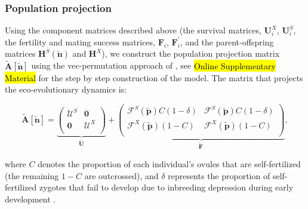 \documentclass[11pt]{article}
\def\mbf#1{\mathbf{#1}}
\def\mcal#1{\mathcal{#1}}
\begin{document}
\subsubsection*{Population projection}
Using the component matrices described above (the survival matrices, $\mathbf{U}^X_i$, $\mathbf{U}^S_i$, the fertility and mating success matrices, $\mathbf{F}_i$, $\mathbf{F}^\prime_i$, and the parent-offspring matrices $\mbf{H}^S(\tilde{\mbf{n}})$ and $\mbf{H}^X$), we construct the population projection matrix $\tilde{\mbf{A}}[\tilde{\mbf{n}}]$ using the vec-permutation approach of \citet{CaswellEtAl2018}, see \hl{Online Supplementary Material} for the step by step construction of the model. The matrix that projects the eco-evolutionary dynamics is:
\begin{linenomath*}
\begin{equation} \label{eq:Atilde}
	\tilde{\mbf{A}}[\tilde{\mbf{n}}] = 
			\underbrace{\left(
			\begin{array}{c|c}
				\mcal{U}^S & \mbf{0} \\ \hline
				\mbf{0} & \mcal{U}^X \\
			\end{array} \right)}_{\tilde{\mbf{U}}} + 
			\underbrace{\left(
			\begin{array}{c|c}
				\mcal{F}^S(\tilde{\mbf{p}}) C(1 - \delta) & \mcal{F}^S(\tilde{\mbf{p}}) C(1 - \delta) \\ \hline
				\mcal{F}^X(\tilde{\mbf{p}}) (1 - C) & \mcal{F}^X(\tilde{\mbf{p}}) (1 - C)\\
			\end{array} \right)}_{\tilde{\mbf{F}}},
\end{equation}
\end{linenomath*}
where $C$ denotes the proportion of each individual's ovules that are self-fertilized (the remaining $1 - C$ are outcrossed), and  $\delta$ represents the proportion of self-fertilized zygotes that fail to develop due to inbreeding depression during early development \citep{Charlesworth1987}. 
\end{document}
